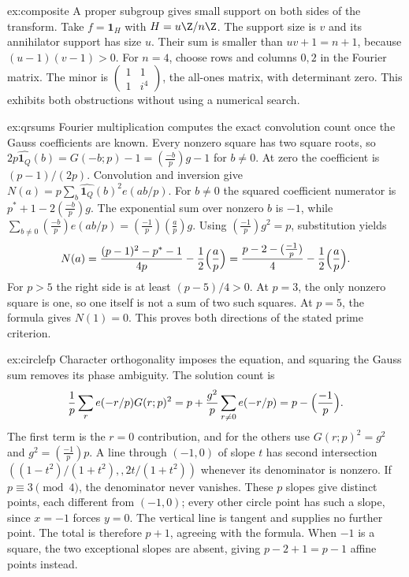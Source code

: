 \begin{solution}{ex:composite}
\idea A proper subgroup gives small support on both sides of the transform.
\writeup Take $f=\mathbf1_H$ with $H=u\Z/n\Z$. The support size is $v$ and its annihilator support has size $u$. Their sum is smaller than $uv+1=n+1$, because $(u-1)(v-1)>0$. For $n=4$, choose rows and columns $0,2$ in the Fourier matrix. The minor is $\begin{pmatrix}1&1\\1&i^4\end{pmatrix}$, the all-ones matrix, with determinant zero. This exhibits both obstructions without using a numerical search.
\end{solution}

\begin{solution}{ex:qrsums}
\idea Fourier multiplication computes the exact convolution count once the Gauss coefficients are known.
\writeup Every nonzero square has two square roots, so
$2p\widehat{\mathbf1_Q}(b)=G(-b;p)-1=(\frac{-b}p)g-1$ for $b\ne0$.
At zero the coefficient is $(p-1)/(2p)$. Convolution and inversion give
$N(a)=p\sum_b\widehat{\mathbf1_Q}(b)^2e(ab/p)$.
For $b\ne0$ the squared coefficient numerator is $p^*+1-2(\frac{-b}p)g$. The exponential sum over nonzero $b$ is $-1$, while
$\sum_{b\ne0}(\frac{-b}p)e(ab/p)=(\frac{-1}p)(\frac ap)g$.
Using $(\frac{-1}p)g^2=p$, substitution yields
\[
N(a)=\frac{(p-1)^2-p^*-1}{4p}-\frac12\Bigl(\frac ap\Bigr)
=\frac{p-2-(\frac{-1}p)}4-\frac12\Bigl(\frac ap\Bigr).
\]
For $p>5$ the right side is at least $(p-5)/4>0$. At $p=3$, the only nonzero square is one, so one itself is not a sum of two such squares. At $p=5$, the formula gives $N(1)=0$. This proves both directions of the stated prime criterion.
\end{solution}

\begin{solution}{ex:circlefp}
\idea Character orthogonality imposes the equation, and squaring the Gauss sum removes its phase ambiguity.
\writeup The solution count is
\[
\frac1p\sum_r e(-r/p)G(r;p)^2
=p+\frac{g^2}{p}\sum_{r\ne0}e(-r/p)
=p-\Bigl(\frac{-1}p\Bigr).
\]
The first term is the $r=0$ contribution, and for the others use $G(r;p)^2=g^2$ and $g^2=(\frac{-1}p)p$.
A line through $(-1,0)$ of slope $t$ has second intersection
$((1-t^2)/(1+t^2),,2t/(1+t^2))$ whenever its denominator is nonzero. If $p\equiv3\pmod4$, the denominator never vanishes. These $p$ slopes give distinct points, each different from $(-1,0)$; every other circle point has such a slope, since $x=-1$ forces $y=0$. The vertical line is tangent and supplies no further point. The total is therefore $p+1$, agreeing with the formula. When $-1$ is a square, the two exceptional slopes are absent, giving $p-2+1=p-1$ affine points instead.
\end{solution}

